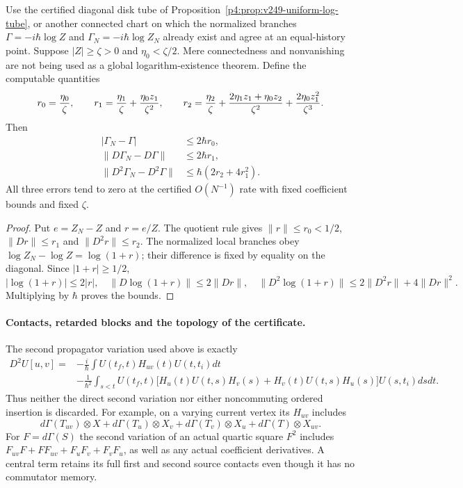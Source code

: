 \documentclass[12pt,a4paper]{article}
\begin{document}
\begin{corollary}
\label{p4:cor:v249-interacting-log-jet-error}
Use the certified diagonal disk tube of
Proposition~\ref{p4:prop:v249-uniform-log-tube}, or another connected
chart on which the normalized branches
$\Gamma=-i\hbar\log Z$ and $\Gamma_N=-i\hbar\log Z_N$ already
exist and agree at an equal-history point. Suppose
$|Z|\ge\zeta>0$ and $\eta_0<\zeta/2$. Mere connectedness and
nonvanishing are not being used as a global logarithm-existence theorem.
Define the computable quantities
\[
 r_0={\eta_0\over\zeta},\qquad
 r_1={\eta_1\over\zeta}+{\eta_0z_1\over\zeta^2},\qquad
 r_2={\eta_2\over\zeta}
       +{2\eta_1z_1+\eta_0z_2\over\zeta^2}
       +{2\eta_0z_1^2\over\zeta^3}.
\]
Then
\begin{equation}
 \boxed{\begin{aligned}
 |\Gamma_N-\Gamma|&\le2\hbar r_0,\\
 \|D\Gamma_N-D\Gamma\|&\le2\hbar r_1,\\
 \|D^2\Gamma_N-D^2\Gamma\|&\le\hbar(2r_2+4r_1^2).
 \end{aligned}}
 \label{p4:eq:v249-log-two-jet-error}
\end{equation}
All three errors tend to zero at the certified $O(N^{-1})$ rate with
fixed coefficient bounds and fixed $\zeta$.
\end{corollary}
\begin{proof}
Put $e=Z_N-Z$ and $r=e/Z$. The quotient rule gives
$\|r\|\le r_0<1/2$, $\|Dr\|\le r_1$ and $\|D^2r\|\le r_2$.
The normalized local branches obey
$\log Z_N-\log Z=\log(1+r)$; their difference is fixed by equality
on the diagonal. Since $|1+r|\ge1/2$,
\[
 |\log(1+r)|\le2|r|,\quad
 \|D\log(1+r)\|\le2\|Dr\|,\quad
 \|D^2\log(1+r)\|\le2\|D^2r\|+4\|Dr\|^2.
\]
Multiplying by $\hbar$ proves the bounds.
\end{proof}

\paragraph{Contacts, retarded blocks and the topology of the certificate.}
The second propagator variation used above is exactly
\begin{align*}
 D^2U[u,v]={}&-\frac{i}{\hbar}\int
 U(t_f,t)H_{uv}(t)U(t,t_i)dt\\
 &-\frac{1}{\hbar^2}\int_{s<t}U(t_f,t)
 \bigl[H_u(t)U(t,s)H_v(s)+H_v(t)U(t,s)H_u(s)\bigr]
 U(s,t_i)dsdt.
\end{align*}
Thus neither the direct second variation nor either noncommuting ordered
insertion is discarded. For example, on a varying current vertex its
$H_{uv}$ includes
\[
 d\Gamma(T_{uv})\otimes X+d\Gamma(T_u)\otimes X_v
 +d\Gamma(T_v)\otimes X_u+d\Gamma(T)\otimes X_{uv}.
\]
For $F=d\Gamma(S)$ the second variation of an actual quartic square
$F^2$ includes $F_{uv}F+FF_{uv}+F_uF_v+F_vF_u$, as well as any
actual coefficient derivatives. A central term retains its full first
and second source contacts even though it has no commutator memory.
\end{document}
